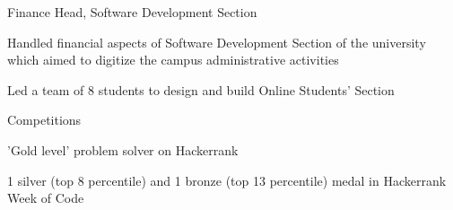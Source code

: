 
\begin{cventries}
  \cventry
    {} %
    {Finance Head, Software Development Section} %
    {} %
    {} %
    {
      \begin{cvitems} %
        \item {Handled financial aspects of Software Development Section of the university which aimed to digitize the campus administrative activities}
        \item {Led a team of 8 students to design and build Online Students' Section}
      \end{cvitems}
    }

  \cventry
    {} %
    {Competitions} %
    {} %
    {} %
    {
      \begin{cvitems} %
      	\item {'Gold level' problem solver on Hackerrank }
      	\item {1 silver (top 8 percentile) and 1 bronze (top 13 percentile) medal in Hackerrank Week of Code}
      \end{cvitems}
    }
\end{cventries}